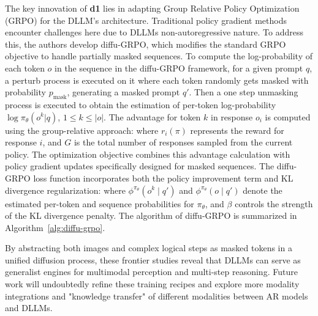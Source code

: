 The key innovation of \textbf{d1} lies in adapting Group Relative Policy Optimization (GRPO) for the DLLM's architecture. Traditional policy gradient methods encounter challenges here due to DLLMs non-autoregressive nature. To address this, the authors develop diffu-GRPO, which modifies the standard GRPO objective to handle partially masked sequences. To compute the log-probability of each token $o$ in the sequence in the diffu-GRPO framework, for a given prompt $q$, a perturb process is executed on it where each token randomly gets masked with probability $p_{\text{mask}}$, generating a masked prompt $q'$. Then a one step unmasking process is executed to obtain the estimation of per-token log-probability $\log \pi_\theta(o^k | q)$, $1\leq k \leq |o|$. The advantage for token $k$ in response $o_i$ is computed using the group-relative approach: 
%
where $r_i(\pi)$ represents the reward for response $i$, and $G$ is the total number of responses sampled from the current policy. The optimization objective combines this advantage calculation with policy gradient updates specifically designed for masked sequences. The diffu-GRPO loss function incorporates both the policy improvement term and KL divergence regularization:
%
where $\phi^{\pi_\theta}(o^k \mid q')$ and $\phi^{\pi_\theta}(o \mid q')$  denote the estimated per-token and sequence probabilities for $\pi_\theta$, and $\beta$ controls the strength of the KL divergence penalty. The algorithm of diffu-GRPO is summarized in Algorithm~\ref{alg:diffu-grpo}.



By abstracting both images and complex logical steps as masked tokens in a unified diffusion process, these frontier studies reveal that DLLMs can serve as generalist engines for multimodal perception and multi-step reasoning. Future work will undoubtedly refine these training recipes and explore more modality integrations and "knowledge transfer" of different modalities between AR models and DLLMs.

